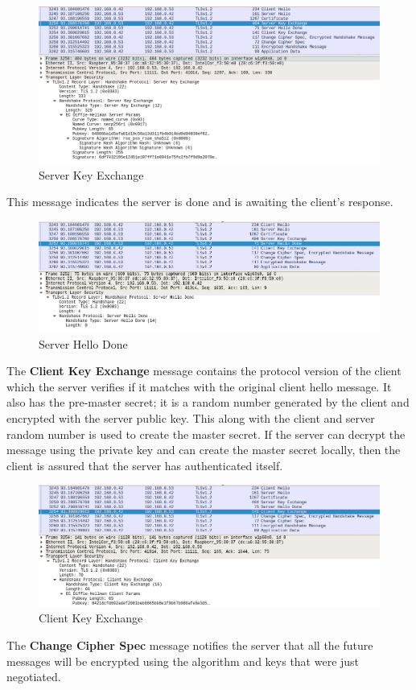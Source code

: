 \documentclass[a4paper,12pt]{article}
\begin{document}
\begin{figure}[H]
    \centering
    \includegraphics[scale=0.400]{./code/img/server-key-exchange.png}
    \caption{Server Key Exchange}
    
\end{figure}
This message indicates the server is done and is awaiting the client's response.
\begin{figure}[H]
    \centering
    \includegraphics[scale=0.400]{./code/img/server-hello-done.png}
    \caption{Server Hello Done}
\end{figure}
The \textbf{Client Key Exchange} message contains the protocol version of the client which the server verifies if it matches with the original client hello message. It also has the pre-master secret; it is a random number generated by the client and encrypted with the server public key. This along with the client and server random number is used to create the master secret. If the server can decrypt the message using the private key and can create the master secret locally, then the client is assured that the server has authenticated itself.
\begin{figure}[H]
    \centering
    \includegraphics[scale=0.400]{./code/img/client-key-exchange.png}
    \caption{Client Key Exchange}
\end{figure}
The \textbf{Change Cipher Spec} message notifies the server that all the future messages will be encrypted using the algorithm and keys that were just negotiated.
\end{document}
